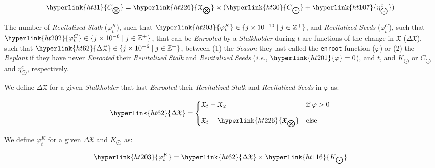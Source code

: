 \documentclass[tikz]{article}
\newcommand{\code}[1]{\texttt{#1}}
\newcommand{\term}[1]{\textsl{#1}}
\begin{document}
    $$
        \hyperlink{ht31}{C_{\bigotimes}} = \hyperlink{ht226}{\mathfrak{X}_{\bigotimes}} \times 
                                    (\hyperlink{ht30}{C_{\bigodot}} + \hyperlink{ht107}{\eta_{\bigodot}^c})
    $$

\newpage

The number of \term{Revitalized} \term{Stalk} (\hyperlink{ht203}{${\varphi}_t^K$}), such that $\hyperlink{ht203}{{\varphi}_t^K} \in \{j \times 10^{-10} \mid j \in \mathbb{Z}^{+} \}$, and \term{Revitalized} \term{Seeds} (\hyperlink{ht202}{${\varphi}_t^C$}), such that $\hyperlink{ht202}{{\varphi}_t^C} \in \{j \times 10^{-6} \mid j \in \mathbb{Z}^{+} \}$, that can be \term{Enrooted} by a \term{Stalkholder} during \hyperlink{ht204}{$t$} are functions of the change in \hyperlink{ht225}{$\mathfrak{X}$} (\hyperlink{ht62}{$\Delta \mathfrak{X}$}), such that $\hyperlink{ht62}{\Delta \mathfrak{X}} \in \{j \times 10^{-6} \mid j \in \mathbb{Z}^{+} \}$, between (1) the \term{Season} they last called the \code{enroot} function (\hyperlink{ht201}{$\varphi$}) or (2) the \term{Replant} if they have never \term{Enrooted} their \term{Revitalized} \term{Stalk} and \term{Revitalized} \term{Seeds} (\term{i.e.}, $\hyperlink{ht201}{\varphi} = 0$), and \hyperlink{ht204}{$t$}, and \hyperlink{ht116}{$K_{\bigodot}$} or \hyperlink{ht30}{$C_{\bigodot}$} and \hyperlink{ht107}{$\eta_{\bigodot}^c$}, respectively. 

We define \hyperlink{ht62}{$\Delta \mathfrak{X}$} for a given \term{Stalkholder} that last \term{Enrooted} their \term{Revitalized} \term{Stalk} and \term{Revitalized} \term{Seeds} in \hyperlink{ht201}{$\varphi$} as:

    $$
    \hyperlink{ht62}{\Delta \mathfrak{X}} = 
    \begin{cases} 
        \mathfrak{X}_{t} - \mathfrak{X}_\varphi 
            & \text{if} \; \varphi > 0 \vspace{.3cm} \\ 
            
        \mathfrak{X}_{t} - \hyperlink{ht226}{\mathfrak{X}_{\bigotimes}} 
        & \text{else}
    \end{cases}
    $$

We define \hyperlink{ht203}{${\varphi}_t^K$} for a given \hyperlink{ht62}{$\Delta \mathfrak{X}$} and \hyperlink{ht116}{$K_{\bigodot}$} as:

    $$
        \hyperlink{ht203}{{\varphi}_t^K} = \hyperlink{ht62}{\Delta \mathfrak{X}} \times 
                                                                \hyperlink{ht116}{K_{\bigodot}}
    $$
\end{document}
